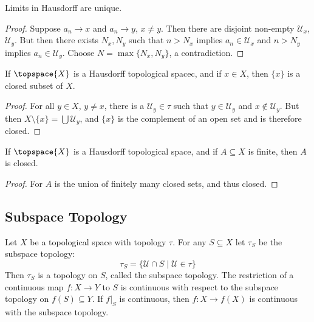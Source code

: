     \begin{theorem}
        Limits in Hausdorff are unique.
    \end{theorem}
    \begin{proof}
        Suppose $a_{n}\rightarrow{x}$ and $a_{n}\rightarrow{y}$, $x\ne{y}$.
        Then there are disjoint non-empty $\mathcal{U}_{x}$,
        $\mathcal{U}_{y}$. But then there exists $N_{x},N_{y}$ such that
        $n>N_{x}$ implies $a_{n}\in\mathcal{U}_{x}$ and $n>N_{y}$ implies
        $a_{n}\in\mathcal{U}_{y}$. Choose $N=\max\{N_{x},N_{y}\}$, a
        contradiction.
    \end{proof}
    \begin{theorem}
        If $\topspace{X}$ is a Hausdorff topological spacec, and if
        $x\in{X}$, then $\{x\}$ is a closed subset of $X$.
    \end{theorem}
    \begin{proof}
        For all $y\in{X}$, $y\ne{x}$, there is a $\mathcal{U}_{y}\in\tau$
        such that $y\in\mathcal{U}_{y}$ and $x\notin\mathcal{U}_{y}$. But
        then $X\setminus\{x\}=\bigcup\mathcal{U}_{y}$, and $\{x\}$ is
        the complement of an open set and is therefore closed.
    \end{proof}
    \begin{theorem}
        If $\topspace{X}$ is a Hausdorff topological space, and if
        $A\subseteq{X}$ is finite, then $A$ is closed.
    \end{theorem}
    \begin{proof}
        For $A$ is the union of finitely many closed sets, and thus closed.
    \end{proof}
    \subsection{Subspace Topology}
        Let $X$ be a topological space with topology $\tau$. For any
        $S\subseteq{X}$ let $\tau_{S}$ be the subspace topology:
        \begin{equation}
            \tau_{S}=\{\mathcal{U}\cap{S}\;|\;\mathcal{U}\in\tau\}
        \end{equation}
        Then $\tau_{S}$ is a topology on $S$, called the subspace
        topology. The restriction of a continuous map
        $f:X\rightarrow{Y}$ to $S$ is continuous with respect to the
        subspace topology on $f(S)\subseteq{Y}$. If $f|_{S}$ is
        continuous, then $f:X\rightarrow{f}(X)$ is continuous with the
        subspace topology.

